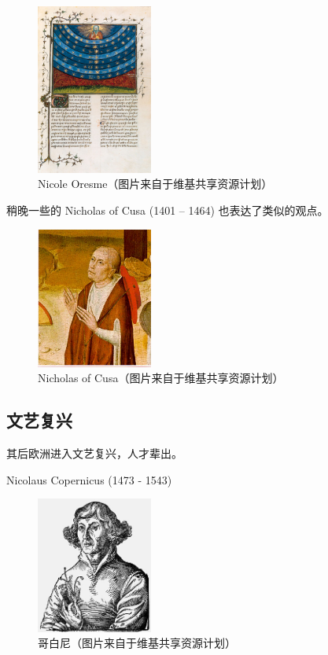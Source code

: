 \documentclass[a4paper,10.5pt]{article}
\begin{document}
\begin{figure}[ht]
\centering
\includegraphics[width=1.5in]{images/1_03-Oresme_Spheres.jpg}
\caption{Nicole Oresme（图片来自于维基共享资源计划）}
\end{figure}

稍晚一些的 Nicholas of Cusa  (1401 – 1464) 也表达了类似的观点。

\begin{figure}[ht]
\centering
\includegraphics[width=1.5in]{images/1_04-Nicholas_of_Cusa.jpg}
\caption{Nicholas of Cusa（图片来自于维基共享资源计划）}
\end{figure}

\newpage

\subsection{文艺复兴}

其后欧洲进入文艺复兴，人才辈出。

Nicolaus Copernicus (1473 - 1543)

\begin{figure}[ht]
\centering
\includegraphics[width=1.5in]{images/1_05-Mikolaj_Kopernik.jpg}
\caption{哥白尼（图片来自于维基共享资源计划）}
\end{figure}
\end{document}
